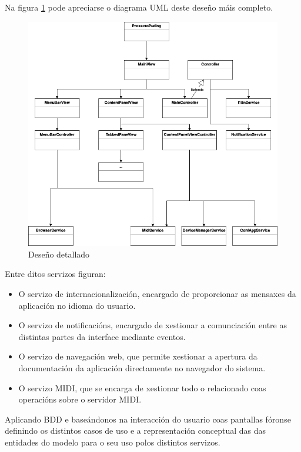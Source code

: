   Na figura \ref{figura:DesenoBaixoNivel} pode apreciarse o diagrama UML deste
  deseño máis completo.
  
  \begin{figure}[htbp]
    \centering
    \includegraphics[scale=0.6, keepaspectratio=true]{./imagenes/deseno-bn.png}
    \caption{Deseño detallado}
    \label{figura:DesenoBaixoNivel}
   \end{figure}
  
  Entre ditos servizos figuran:
   
   \begin{itemize}
    \item O servizo de internacionalización, encargado de proporcionar as
        mensaxes da aplicación no idioma do usuario.
    \item O servizo de notificacións, encargado de xestionar a comunciación
        entre as distintas partes da interface mediante eventos.
    \item O servizo de navegación web, que permite xestionar a apertura da
        documentación da aplicación directamente no navegador do sistema.
    \item O servizo MIDI, que se encarga de xestionar todo o relacionado coas
        operacións sobre o servidor MIDI.
   \end{itemize}
   
   Aplicando BDD e baseándonos na interacción do usuario coas pantallas fóronse
   definindo os distintos casos de uso e a representación conceptual das
   das entidades do modelo para o seu uso polos distintos servizos. \\
   
